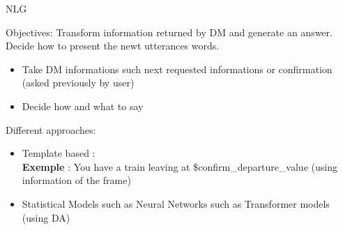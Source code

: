 \documentclass[10pt,aspectratio=169]{beamer}
\begin{document}
\begin{frame}{NLG}
    \begin{block}{Objectives:}
        Transform information returned by DM and generate an answer. Decide how to present the newt utterances words.
        \begin{itemize}
            \item Take DM informations such next requested informations or confirmation (asked previously by user)
            \item Decide how and what to say
        \end{itemize}
    \end{block}
    \begin{block}{Different approaches: }
        \begin{itemize}
            \item Template based : \\
                \textbf{Exemple} : You have a train leaving at \$confirm\_departure\_value (using information of the frame)
            \item Statistical Models such as Neural Networks such as Transformer models \cite{peng-etal-2020-shot} (using DA)

        \end{itemize}
    \end{block}
\end{frame}
\end{document}
